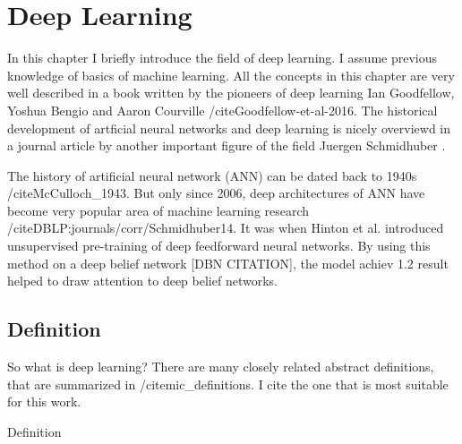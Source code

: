 \chapter{Deep Learning}


In this chapter I briefly introduce the field of deep learning. I assume previous knowledge of basics of machine learning.
All the concepts in this chapter are very well described in a book written by the pioneers of deep learning Ian Goodfellow, 
Yoshua Bengio and Aaron Courville /cite{Goodfellow-et-al-2016}. The historical development of artficial neural networks and
deep learning is nicely overviewd in a journal article by another important figure of the field Juergen Schmidhuber 
\cite{DBLP:journals/corr/Schmidhuber14}.

The history of artificial neural network (ANN) can be dated back to 1940s /cite{McCulloch_1943}. But only since 2006, deep 
architectures of ANN have become very popular area of machine learning research /cite{DBLP:journals/corr/Schmidhuber14}. It was
when Hinton et al. introduced unsupervised pre-training of deep feedforward neural networks. By using this method on a deep belief
network [DBN CITATION], the model achiev 1.2%
result helped to draw attention to deep belief networks.

\section{Definition}
So what is deep learning? There are many closely related abstract definitions, that are summarized in /cite{mic_definitions}. 
I cite the one that is most suitable for this work. 

Definition